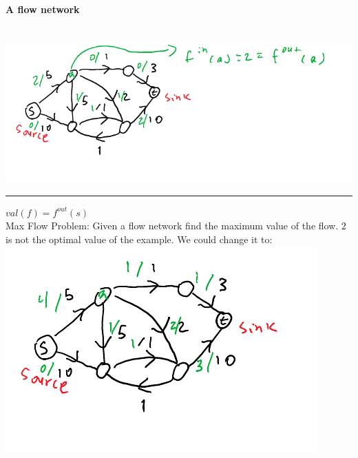 \documentclass[12 pt]{article}
\begin{document}
        \paragraph{A flow network}~\\
        \includegraphics[width=.7\textwidth]{i4.pdf}
        \\ \rule{\textwidth}{0.5pt}
        $val(f)=f^{out}(s)$
        \\ Max Flow Problem: Given a flow network find the maximum
        value of the flow. $2$ is not the optimal value of the
        example. We could change it to:
        \\ \includegraphics[width=.7\textwidth]{i5.pdf}
\end{document}
